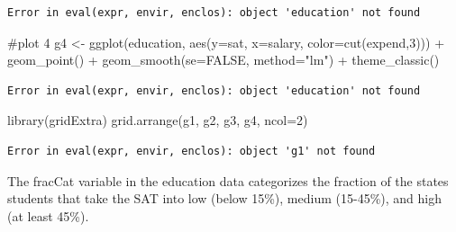\documentclass[
  letterpaper,
  DIV=11,
  numbers=noendperiod]{scrreprt}
\newenvironment{Shaded}{\begin{snugshade}}{\end{snugshade}}
\newcommand{\AttributeTok}[1]{\textcolor[rgb]{0.40,0.45,0.13}{#1}}
\newcommand{\CommentTok}[1]{\textcolor[rgb]{0.37,0.37,0.37}{#1}}
\newcommand{\ConstantTok}[1]{\textcolor[rgb]{0.56,0.35,0.01}{#1}}
\newcommand{\DecValTok}[1]{\textcolor[rgb]{0.68,0.00,0.00}{#1}}
\newcommand{\FunctionTok}[1]{\textcolor[rgb]{0.28,0.35,0.67}{#1}}
\newcommand{\NormalTok}[1]{\textcolor[rgb]{0.00,0.23,0.31}{#1}}
\newcommand{\OtherTok}[1]{\textcolor[rgb]{0.00,0.23,0.31}{#1}}
\newcommand{\SpecialCharTok}[1]{\textcolor[rgb]{0.37,0.37,0.37}{#1}}
\newcommand{\StringTok}[1]{\textcolor[rgb]{0.13,0.47,0.30}{#1}}
\begin{document}
\begin{verbatim}
Error in eval(expr, envir, enclos): object 'education' not found
\end{verbatim}

\begin{Shaded}
\begin{Highlighting}[]
\CommentTok{\#plot 4}
\NormalTok{g4 }\OtherTok{\textless{}{-}} \FunctionTok{ggplot}\NormalTok{(education, }\FunctionTok{aes}\NormalTok{(}\AttributeTok{y=}\NormalTok{sat, }\AttributeTok{x=}\NormalTok{salary, }\AttributeTok{color=}\FunctionTok{cut}\NormalTok{(expend,}\DecValTok{3}\NormalTok{))) }\SpecialCharTok{+} 
    \FunctionTok{geom\_point}\NormalTok{() }\SpecialCharTok{+} 
    \FunctionTok{geom\_smooth}\NormalTok{(}\AttributeTok{se=}\ConstantTok{FALSE}\NormalTok{, }\AttributeTok{method=}\StringTok{"lm"}\NormalTok{) }\SpecialCharTok{+} \FunctionTok{theme\_classic}\NormalTok{()}
\end{Highlighting}
\end{Shaded}

\begin{verbatim}
Error in eval(expr, envir, enclos): object 'education' not found
\end{verbatim}

\begin{Shaded}
\begin{Highlighting}[]
\FunctionTok{library}\NormalTok{(gridExtra)}
\FunctionTok{grid.arrange}\NormalTok{(g1, g2, g3, g4, }\AttributeTok{ncol=}\DecValTok{2}\NormalTok{)}
\end{Highlighting}
\end{Shaded}

\begin{verbatim}
Error in eval(expr, envir, enclos): object 'g1' not found
\end{verbatim}

\hfill\break

\begin{Shaded}
\begin{Highlighting}[]
\NormalTok{The \textasciigrave{}fracCat\textasciigrave{} variable in the \textasciigrave{}education\textasciigrave{} data categorizes the fraction of the state\textquotesingle{}s students that take the SAT into \textasciigrave{}low\textasciigrave{} (below 15\%), \textasciigrave{}medium\textasciigrave{} (15{-}45\%), and \textasciigrave{}high\textasciigrave{} (at least 45\%).}
\end{Highlighting}
\end{Shaded}
\end{document}
